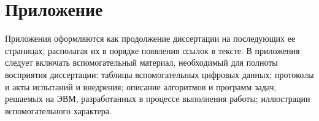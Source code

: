 \renewcommand{\thefigure}{\Asbuk{section}.\arabic{figure}}
\renewcommand{\thetable}{\Asbuk{section}.\arabic{table}}
\renewcommand{\thelstlisting}{\Asbuk{section}.\arabic{lstlisting}}

\chapter*{Приложение}

\setcounter{section}{1}
\setcounter{figure}{0}
\setcounter{table}{0}
\setcounter{lstlisting}{0}

Приложения оформляются как продолжение диссертации на последующих ее страницах, располагая их в порядке появления ссылок в тексте. В приложения следует включать вспомогательный материал, необходимый для полноты восприятия диссертации: таблицы вспомогательных цифровых данных; протоколы и акты испытаний и внедрения; описание  алгоритмов и программ задач, решаемых на ЭВМ, разработанных в процессе выполнения работы; иллюстрации вспомогательного характера.